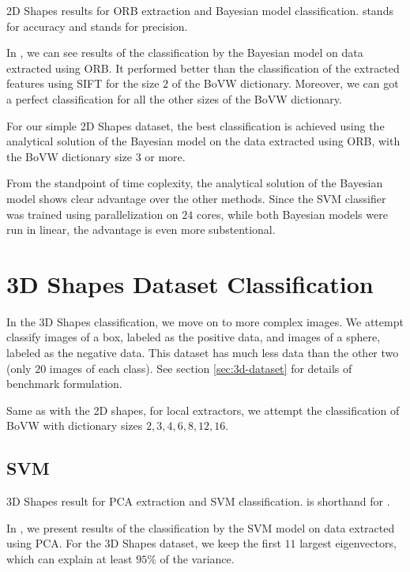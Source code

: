 \begin{table}[ht!]
    \centering
    
    \caption[2D Shapes results for ORB extraction and Bayesian model classification]{2D Shapes results for ORB extraction and Bayesian model classification.  stands for accuracy and  stands for precision.}
    \label{tab:2d_ORB_bayes}
\end{table}
In , we can see results of the classification by the Bayesian model on data extracted using ORB. It performed better than the classification of the extracted features using SIFT for the size $2$ of the BoVW dictionary. Moreover, we can got a perfect classification for all the other sizes of the BoVW dictionary.

For our simple 2D Shapes dataset, the best classification is achieved using the analytical solution of the Bayesian model on the data extracted using ORB, with the BoVW dictionary size $3$ or more.

From the standpoint of time coplexity, the analytical solution of the Bayesian model shows clear advantage over the other methods. Since the SVM classifier was trained using parallelization on $24$ cores, while both Bayesian models were run in linear, the advantage is even more substentional.

\section{3D Shapes Dataset Classification}
In the 3D Shapes classification, we move on to more complex images. We attempt classify images of a box, labeled as the positive data, and images of a sphere, labeled as the negative data. This dataset has much less data than the other two (only $20$ images of each class). See section \ref{sec:3d-dataset} for details of benchmark formulation.

Same as with the 2D shapes, for local extractors, we attempt the classification of BoVW with dictionary sizes $2, 3, 4, 6, 8, 12, 16$.

\subsection{SVM}
\begin{table}[ht!]
    \centering
    
    \caption[3D Shapes result for PCA extraction and SVM classification]{3D Shapes result for PCA extraction and SVM classification.  is shorthand for .}
    \label{tab:3d_PCA_SVM}
\end{table}
In , we present results of the classification by the SVM model on data extracted using PCA. For the 3D Shapes dataset, we keep the first $11$ largest eigenvectors, which can explain at least $95\%$ of the variance.

